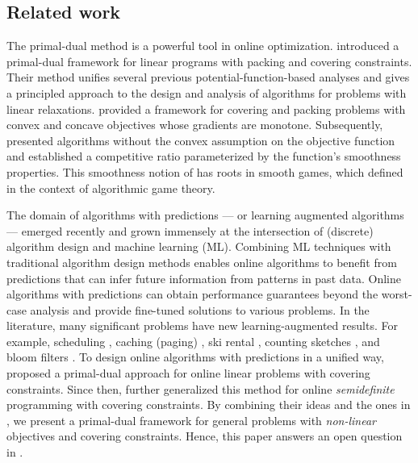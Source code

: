 \subsection{Related work}
The primal-dual method is a powerful tool in online optimization. \cite{BuchbinderNaor09:The-Design-of-Competitive} introduced a primal-dual framework for linear programs with packing and covering constraints. Their method unifies several previous potential-function-based analyses and gives a principled approach to the design and analysis of algorithms for problems with linear relaxations. \cite{AzarBuchbinder16:Online-Algorithms} provided a framework for covering and packing problems with convex and concave objectives whose gradients are monotone. Subsequently, \cite{Thang20:Online-Primal-Dual} presented algorithms without the convex assumption on the objective function and established a competitive ratio parameterized by the function's smoothness properties. This smoothness notion of \cite{Thang20:Online-Primal-Dual} has roots in smooth games, which \cite{Roughgarden15:Intrinsic-Robustness} defined in the context of algorithmic game theory.

The domain of algorithms with predictions \cite{MitzenmacherVassilvitskii20:Beyond-the-Worst-Case} --- or learning augmented algorithms --- emerged recently and grown immensely at the intersection of (discrete) algorithm design and machine learning (ML).
Combining ML techniques with traditional algorithm design methods enables online algorithms to benefit from predictions that can infer future information from patterns in past data. Online algorithms with predictions can obtain performance guarantees beyond the worst-case analysis and provide fine-tuned solutions to various problems. In the literature, many significant problems have new learning-augmented results. For example, scheduling \cite{LattanziLavastida20:Online-scheduling,Mitzenmacher20:Scheduling-with}, caching (paging) \cite{LykourisVassilvtiskii18:Competitive-caching,Rohatgi20:Near-optimal-bounds,AntoniadisCoester20:Online-metric}, ski rental \cite{GollapudiPanigrahi19:Online-algorithms,KumarPurohit18:Improving-online}, counting sketches \cite{HsuIndyk19:Learning-Based-Frequency}, and bloom filters \cite{KraskaBeutel18:The-case-for-learned,Mitzenmacher18:A-model-for-learned}.
To design online algorithms with predictions in a unified way, \cite{BamasMaggiori20:The-Primal-Dual-method} proposed a primal-dual approach for online linear problems with covering constraints. Since then, \cite{GrigorescuLin22:Learning-Augmented-Algorithms} further generalized this method for online \emph{semidefinite} programming with covering constraints. By combining their ideas and the ones in \cite{BuchbinderNaor09:The-Design-of-Competitive,AzarBuchbinder16:Online-Algorithms,Thang20:Online-Primal-Dual}, we present a primal-dual framework for general problems with \emph{non-linear} objectives and covering constraints. Hence, this paper answers an open question in \cite{BamasMaggiori20:The-Primal-Dual-method}.


